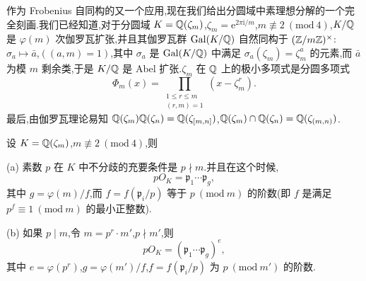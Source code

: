 作为 Frobenius 自同构的又一个应用,现在我们给出分圆域中素理想分解的一个完全刻画.我们已经知道,对于分圆域 $K=\mathbb{Q}(\zeta_m)$,$\zeta_m=\mathrm{e}^{2\pi\mathrm{i}/m}$,$m\not\equiv 2\ (\mathrm{mod}\ 4)$,$K/\mathbb{Q}$ 是 $\varphi(m)$ 次伽罗瓦扩张,并且其伽罗瓦群 $\operatorname{Gal}(K/\mathbb{Q})$ 自然同构于 $(\mathbb{Z}/m\mathbb{Z})^\times$:$\sigma_a\mapsto\bar{a}$,$((a,m)=1)$,其中 $\sigma_a$ 是 $\operatorname{Gal}(K/\mathbb{Q})$ 中满足 $\sigma_a(\zeta_m)=\zeta_m^a$ 的元素,而 $\bar{a}$ 为模 $m$ 剩余类,于是 $K/\mathbb{Q}$ 是 Abel 扩张.$\zeta_m$ 在 $\mathbb{Q}$ 上的极小多项式是分圆多项式
\[
  \Phi_m(x)=\prod_{\substack{1\leqslant r\leqslant m\\ (r,m)=1}}(x-\zeta_m^r).
\]
最后,由伽罗瓦理论易知 $\mathbb{Q}(\zeta_m)\mathbb{Q}(\zeta_n)=\mathbb{Q}(\zeta_{[m,n]})$,$\mathbb{Q}(\zeta_m)\cap\mathbb{Q}(\zeta_n)=\mathbb{Q}(\zeta_{(m,n)})$.

\begin{theorem}\label{thm:2.14}
设 $K=\mathbb{Q}(\zeta_m)$,$m\not\equiv 2\ (\mathrm{mod}\ 4)$,则

(a) 素数 $p$ 在 $K$ 中不分歧的充要条件是 $p\nmid m$.并且在这个时候,
\[
  pO_K=\mathfrak{p}_1\cdots\mathfrak{p}_g,
\]
其中 $g=\varphi(m)/f$,而 $f=f(\mathfrak{p}_i/p)$ 等于 $p\ (\mathrm{mod}\ m)$ 的阶数(即 $f$ 是满足 $p^f\equiv 1\ (\mathrm{mod}\ m)$ 的最小正整数).

(b) 如果 $p\mid m$,令 $m=p^r\cdot m'$,$p\nmid m'$,则
\[
  pO_K=(\mathfrak{p}_1\cdots\mathfrak{p}_g)^e,
\]
其中 $e=\varphi(p^r)$,$g=\varphi(m')/f$,$f=f(\mathfrak{p}_i/p)$ 为 $p\ (\mathrm{mod}\ m')$ 的阶数.
\end{theorem}

